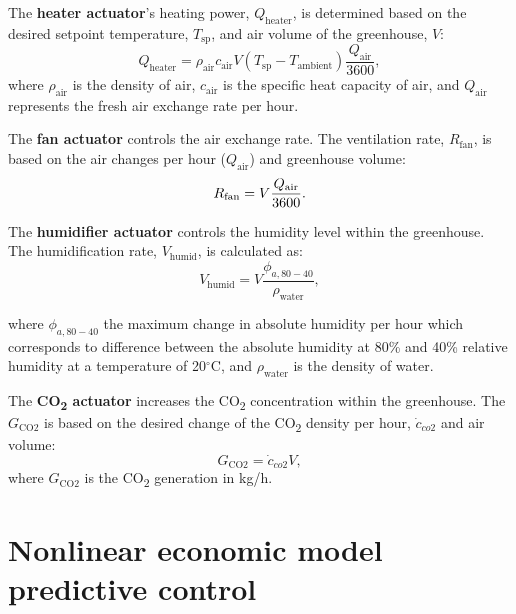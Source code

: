 \documentclass[conference]{IEEEtran}
\begin{document}
The \textbf{heater actuator}'s heating power, \( Q_{\text{heater}} \), is determined based on the desired setpoint temperature, \( T_{\text{sp}} \), and air volume of the greenhouse, \( V \):
\begin{equation}
    Q_{\text{heater}} = \rho_{\text{air}}  c_{\text{air}}  V  (T_{\text{sp}} - T_{\text{ambient}})  \frac{Q_{\text{air}}}{3600},
\end{equation}
where \( \rho_{\text{air}} \) is the density of air, \( c_{\text{air}} \) is the specific heat capacity of air, and \( Q_{\text{air}} \) represents the fresh air exchange rate per hour.

The \textbf{fan actuator} controls the air exchange rate. The ventilation rate, \( R_{\text{fan}} \), is based on the
air changes per hour (\( Q_{\text{air}} \)) and greenhouse volume:
\begin{equation}
    R_{\text{fan}} = V  \frac{\text{\( Q_{\text{air}} \)}}{3600}.
\end{equation}

The \textbf{humidifier actuator} controls the humidity level within the greenhouse. The humidification rate, \( V_{\text{humid}} \), is calculated as:
\begin{equation}
    V_{\text{humid}} = V  \frac{\phi_{a, 80 - 40}}{\rho_{\text{water}}},
\end{equation}

where \( \phi_{a, 80 - 40} \) the maximum change in absolute humidity per hour which corresponds to difference between the absolute humidity at 80\% and 40\% relative humidity at a temperature of 20\( ^\circ \)C, and \( \rho_{\text{water}} \) is the density of water.

The \textbf{CO\textsubscript{2} actuator} increases the CO\textsubscript{2} concentration within the greenhouse. The \( G_{\text{CO2}} \) is based on the desired change of the CO\textsubscript{2} density per hour, \( \dot{c}_{co2} \) and air volume:
\begin{equation}
    G_{\text{CO2}} = \dot{c}_{co2}  V,
\end{equation}
where \( G_{\text{CO2}} \) is the CO\textsubscript{2} generation in kg/h.


\section{Nonlinear economic model predictive control}\label{sec:mpc}
\end{document}
